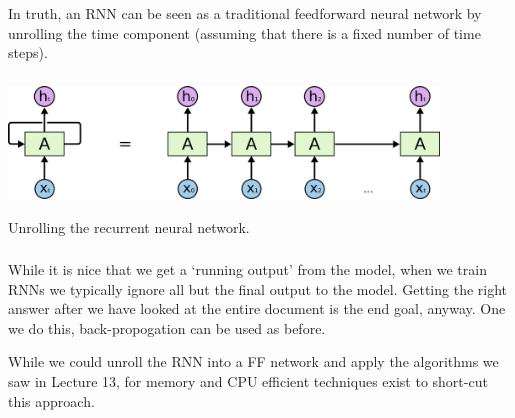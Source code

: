 \documentclass[xetex,mathserif,serif,aspectratio=169]{beamer}
\begin{document}
\begin{frame}[fragile] \frametitle{} \oldB \small


In truth, an RNN can be seen as a traditional feedforward neural
network by unrolling the time component (assuming that there is
a fixed number of time steps).

\end{frame}

\begin{frame}[fragile] \frametitle{} \oldB \small

\begin{center}
\includegraphics[height=3cm]{img/cloah02.png}
\end{center}

Unrolling the recurrent neural network.

\end{frame}

\begin{frame}[fragile] \frametitle{} \oldB \small


While it is nice that we get a `running output' from the model, when
we train RNNs we typically ignore all but the final output to the
model. Getting the right answer after we have looked at the entire
document is the end goal, anyway. One we do this, back-propogation can
be used as before.

While we could unroll the RNN into a FF network and apply the algorithms
we saw in Lecture 13, for memory and CPU efficient techniques exist to
short-cut this approach.

\end{frame}

\begin{frame}[fragile] \frametitle{} \oldB \small


\end{frame}
\end{document}
